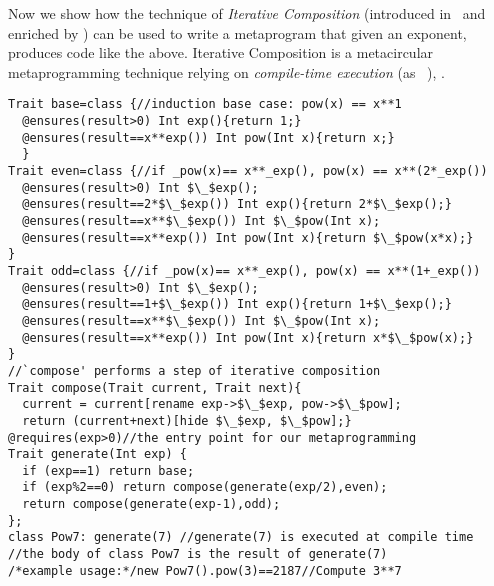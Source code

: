 Now we show how the technique of \emph{Iterative Composition} (introduced in~\cite{servetto2014meta} and
enriched by  ) 
can be used to write a metaprogram that given an exponent, produces code like the above.
Iterative Composition is a metacircular metaprogramming technique relying on \emph{compile-time execution} (as ~\cite{sheard2002template}),  
 .
 

\vspace{-1ex}
\begin{lstlisting}
Trait base=class {//induction base case: pow(x) == x**1
  @ensures(result>0) Int exp(){return 1;}  
  @ensures(result==x**exp()) Int pow(Int x){return x;}
  }
Trait even=class {//if _pow(x)== x**_exp(), pow(x) == x**(2*_exp())
  @ensures(result>0) Int $\_$exp();
  @ensures(result==2*$\_$exp()) Int exp(){return 2*$\_$exp();}
  @ensures(result==x**$\_$exp()) Int $\_$pow(Int x);
  @ensures(result==x**exp()) Int pow(Int x){return $\_$pow(x*x);}
}
Trait odd=class {//if _pow(x)== x**_exp(), pow(x) == x**(1+_exp())
  @ensures(result>0) Int $\_$exp();
  @ensures(result==1+$\_$exp()) Int exp(){return 1+$\_$exp();}
  @ensures(result==x**$\_$exp()) Int $\_$pow(Int x);
  @ensures(result==x**exp()) Int pow(Int x){return x*$\_$pow(x);}
}
//`compose' performs a step of iterative composition
Trait compose(Trait current, Trait next){
  current = current[rename exp->$\_$exp, pow->$\_$pow];
  return (current+next)[hide $\_$exp, $\_$pow];}
@requires(exp>0)//the entry point for our metaprogramming
Trait generate(Int exp) {
  if (exp==1) return base;
  if (exp%2==0) return compose(generate(exp/2),even);
  return compose(generate(exp-1),odd);
};
class Pow7: generate(7) //generate(7) is executed at compile time
//the body of class Pow7 is the result of generate(7)
/*example usage:*/new Pow7().pow(3)==2187//Compute 3**7
\end{lstlisting}
\vspace{-1ex}